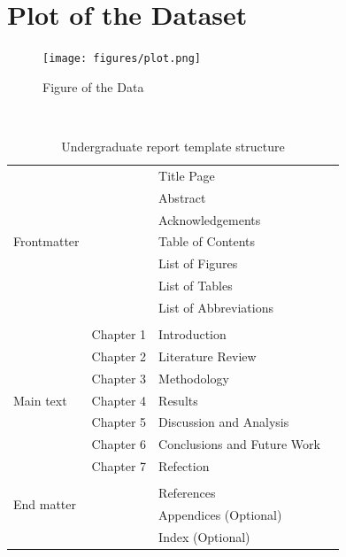 \section{Plot of the Dataset}


\begin{figure}[ht]
    \centering
    \texttt{[image: figures/plot.png]}
    \caption{Figure of the Data}
    \label{fig:Plot of the Data}
\end{figure}
\


\begin{table}[ht!]
    \centering
    \caption{Undergraduate report template structure}
    \label{tab:gen_template}
    \begin{tabular}{llll}     
        \toprule
        \multirow{7}{3cm}{Frontmatter} 
        & & Title Page & \\                  
        & & Abstract &    \\          
        & & Acknowledgements & \\                            
        & & Table of Contents &    \\                                
        & & List of Figures   &    \\                        
        & & List of Tables    &    \\                
        & & List of Abbreviations  &    \\                     
        & &   &    \\                        
        \multirow{7}{3cm}{Main text}
        & Chapter 1 & Introduction   &    \\                         
        & Chapter 2 & Literature Review   &    \\
        & Chapter 3 & Methodology   &    \\
        & Chapter 4 & Results    &    \\
        & Chapter 5 & Discussion and Analysis  &    \\
        & Chapter 6 & Conclusions and Future Work  &    \\        
        & Chapter 7 & Refection  &    \\          
        & &   &    \\                       
        \multirow{2}{3cm}{End matter}
        & & References  &    \\   
        & & Appendices (Optional)  &    \\ 
        & & Index (Optional)  &    \\ 
        \bottomrule
    \end{tabular}
\end{table}

